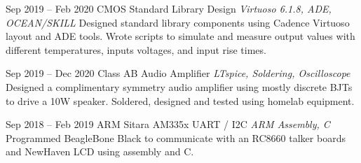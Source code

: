 \documentclass[letterpaper]{moderncv}        %
\begin{document}
\cventry
{Sep 2019 -- Feb 2020}
{CMOS Standard Library Design}
{}
{\textit{Virtuoso 6.1.8, ADE, OCEAN/SKILL}}
{}
{Designed standard library components using Cadence Virtuoso layout and ADE tools.  Wrote scripts to simulate and measure output values with different temperatures, inputs voltages, and input rise times.\\}	

\cventry
{Sep 2019 -- Dec 2020}
{Class AB Audio Amplifier}
{}
{\textit{LTspice, Soldering, Oscilloscope}}
{}
{Designed a complimentary symmetry audio amplifier using mostly discrete BJTs to drive a 10W speaker.  Soldered, designed and tested using homelab equipment.\\}

\cventry
{Sep 2018 -- Feb 2019}
{ARM Sitara AM335x UART / I2C}
{}
{\textit{ARM Assembly, C}}
{}
{Programmed BeagleBone Black to communicate with an RC8660 talker boards and NewHaven LCD using assembly and C.\\}	




	


	
	
\end{document}
